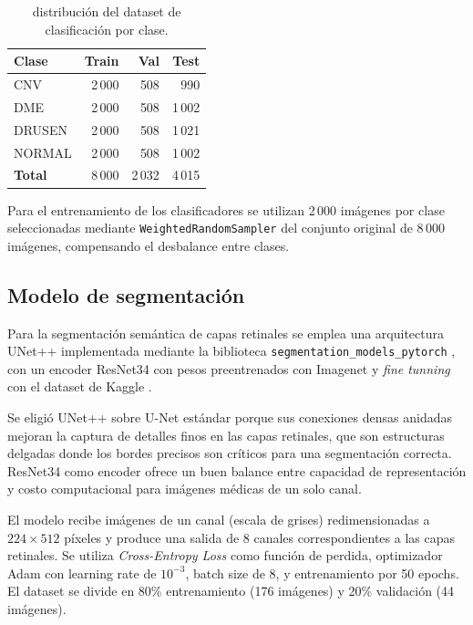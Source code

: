 \documentclass[journal, twocolumn]{IEEEtran}
\begin{document}
\begin{table}[h]
\caption{distribución del dataset de clasificación por clase.}
\label{tab:dataset}
\centering
\begin{tabular}{lrrr}
\toprule
\textbf{Clase} & \textbf{Train} & \textbf{Val} & \textbf{Test} \\
\midrule
CNV    & 2\,000 & 508 & 990 \\
DME    & 2\,000 & 508 & 1\,002 \\
DRUSEN & 2\,000& 508 & 1\,021 \\
NORMAL & 2\,000 & 508 & 1\,002 \\
\midrule
\textbf{Total} & 8\,000 & 2\,032 & 4\,015 \\
\bottomrule
\end{tabular}
\end{table}

Para el entrenamiento de los clasificadores se utilizan 2\,000 imágenes por clase seleccionadas mediante \texttt{WeightedRandomSampler} del conjunto original de 8\,000 imágenes, compensando el desbalance entre clases.

\subsection{Modelo de segmentación}

Para la segmentación semántica de capas retinales se emplea una arquitectura UNet++ \cite{zhou2018} implementada mediante la biblioteca \texttt{segmentation\_models\_pytorch} \cite{smp}, con un encoder ResNet34 \cite{he2016deep} con pesos preentrenados con Imagenet y \textit{fine tunning} con el dataset de Kaggle  \cite{kaggle_platform}.

Se eligió UNet++ sobre U-Net estándar porque sus conexiones densas anidadas mejoran la captura de detalles finos en las capas retinales, que son estructuras delgadas donde los bordes precisos son críticos para una segmentación correcta. ResNet34 como encoder ofrece un buen balance entre capacidad de representación y costo computacional para imágenes médicas de un solo canal.

El modelo recibe imágenes de un canal (escala de grises) redimensionadas a $224 \times 512$ píxeles y produce una salida de 8 canales correspondientes a las capas retinales. Se utiliza \textit{Cross-Entropy Loss} como función de perdida, optimizador Adam con learning rate de $10^{-3}$, batch size de 8, y entrenamiento por 50 epochs. El dataset se divide en 80\% entrenamiento (176 imágenes) y 20\% validación (44 imágenes).
\end{document}
